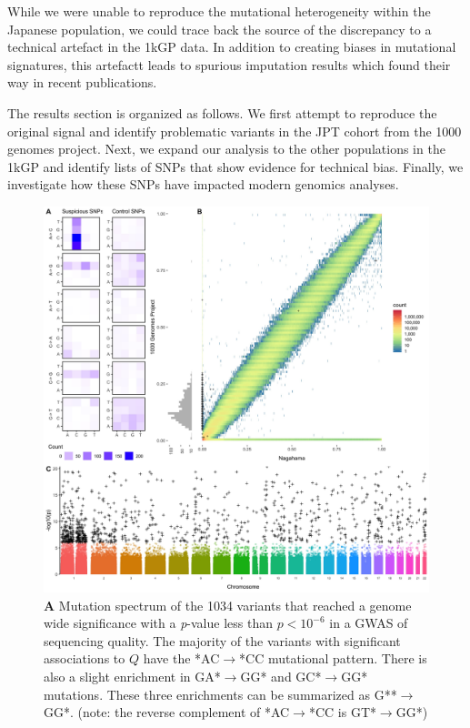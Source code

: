 \documentclass[9pt,lineno]{elife}
\begin{document}
While we were unable to reproduce the mutational heterogeneity within the Japanese population, we could trace back the source of the discrepancy to a technical artefact in the 1kGP data.
In addition to creating biases in mutational signatures, this artefactt leads to spurious imputation results which found their way in recent publications.


The results section is organized as follows.
We first attempt to reproduce the original signal and identify problematic variants in the JPT cohort from the 1000 genomes project. 
Next, we expand our analysis to the other populations in the 1kGP and identify lists of SNPs that show evidence for technical bias.
Finally, we investigate how these SNPs have impacted modern genomics analyses.  
  

\begin{figure}
\includegraphics[width=\hsize,keepaspectratio]{./Figures/Figure1.jpg}
\caption{
\textbf{A} 
Mutation spectrum of the 1034 variants that reached a genome wide significance with a \textit{p}-value less than $p < 10^{-6}$  in a GWAS of sequencing quality. 
The majority of the variants with significant associations to $Q$ have the *AC${\rightarrow}$*CC mutational pattern. There is also a slight enrichment in GA*${\rightarrow}$GG* and GC*${\rightarrow}$GG* mutations. These three enrichments can be summarized as G**${\rightarrow}$GG*. (note: the reverse complement of *AC${\rightarrow}$*CC is GT*${\rightarrow}$GG*)
}
\end{figure}
\end{document}
